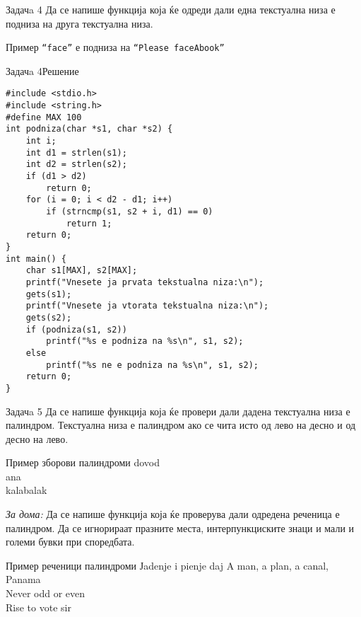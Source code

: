 \begin{frame}{Задачa 4}
Да се напише функција која ќе одреди дали една текстуална низа е подниза на
друга текстуална низа.
\begin{exampleblock}{Пример}
\texttt{``face''} е подниза на \texttt{``Please faceAbook''}
\end{exampleblock}  
\end{frame}

\begin{frame}[fragile]{Задачa 4}{Решение}
\begin{lstlisting}
#include <stdio.h>
#include <string.h>
#define MAX 100
int podniza(char *s1, char *s2) {
    int i;
    int d1 = strlen(s1);
    int d2 = strlen(s2);
    if (d1 > d2)
        return 0;
    for (i = 0; i < d2 - d1; i++)
        if (strncmp(s1, s2 + i, d1) == 0)
            return 1;
    return 0;
}
int main() {
    char s1[MAX], s2[MAX];
    printf("Vnesete ja prvata tekstualna niza:\n");
    gets(s1);
    printf("Vnesete ja vtorata tekstualna niza:\n");
    gets(s2);
    if (podniza(s1, s2))
        printf("%s e podniza na %s\n", s1, s2);
    else
        printf("%s ne e podniza na %s\n", s1, s2);
    return 0;
}
\end{lstlisting}
\end{frame}

\begin{frame}{Задачa 5}
Да се напише функција која ќе провери дали дадена текстуална низа е палиндром.
Текстуална низа е палиндром ако се чита исто од лево на десно и од десно на
лево.
\begin{exampleblock}{Пример зборови палиндроми}
dovod\\
ana\\
kalabalak
\end{exampleblock}
\begin{scriptsize}
\emph{За дома:} Да се напише функција која ќе проверува дали одредена реченица е
палиндром. Да се игнорираат празните места, интерпункциските знаци и мали и
големи бувки при споредбата.
\end{scriptsize}
\begin{exampleblock}{Пример реченици палиндроми}
Јadenje i pienje daj
A man, a plan, a canal, Panama\\
Never odd or even\\
Rise to vote sir
\end{exampleblock}

\end{frame}


